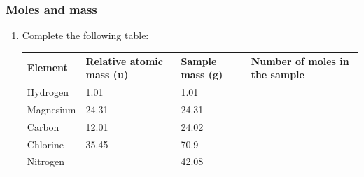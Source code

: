            \subsubsection{  Moles and mass
      }
            \nopagebreak
      \label{m38717*id276067}\begin{enumerate}[noitemsep, label=\textbf{\arabic*}. ] 
            \label{m38717*uid2}\item 
Complete the following table:
          \begin{table}[H]
        \begin{center}
      \label{m38717*id276082}
    \noindent
      \tablelasttail{}
      \begin{xtabular}[t]{|l|l|l|l|}\hline
        \textbf{Element} &
        \textbf{Relative atomic mass (u)} &
        \textbf{Sample mass (g)} &
        \textbf{Number of moles in the sample}%
     \tabularnewline{}
        Hydrogen &
        1.01 &
        1.01 &
     \tabularnewline{}
        Magnesium &
        24.31 &
        24.31 &
     \tabularnewline{}
        Carbon &
        12.01 &
        24.02 &
     \tabularnewline{}
        Chlorine &
        35.45 &
        70.9 &
     \tabularnewline{}
        Nitrogen &
         &
        42.08 &
     \tabularnewline{}
    \end{xtabular}

\end{center}
\end{table}
\end{enumerate}
